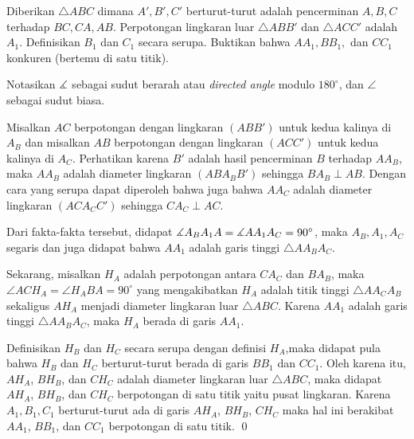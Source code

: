 \documentclass[11pt]{scrartcl}
\begin{document}
	\begin{soalbaru} 
		Diberikan $\triangle ABC$ dimana $A',B',C'$ berturut-turut adalah pencerminan $A,B,C$ terhadap $BC,CA,AB$. Perpotongan lingkaran luar $\triangle ABB'$ dan $\triangle ACC'$ adalah $A_1$. Definisikan $B_1$ dan $C_1$ secara serupa. Buktikan bahwa $AA_1,BB_1,$ dan $CC_1$ konkuren (bertemu di satu titik).\\[-10pt]
		
    \begin{solusi}
		Notasikan $\measuredangle$ sebagai sudut berarah atau \textit{ directed angle} modulo $180^\circ$, dan $\angle$ sebagai sudut biasa.
		
		Misalkan $AC$ berpotongan dengan lingkaran $(ABB')$ untuk kedua kalinya di $A_B$ dan misalkan $AB$ berpotongan dengan lingkaran $(ACC')$ untuk kedua kalinya di $A_C$. Perhatikan karena $B'$ adalah hasil pencerminan $B$ terhadap $AA_B$, maka $AA_B$ adalah diameter lingkaran $(ABA_BB')$ sehingga  $BA_B \perp AB$. Dengan cara yang serupa dapat diperoleh bahwa juga bahwa $AA_C$ adalah diameter lingkaran $(ACA_CC')$ sehingga $CA_C \perp AC$.
		
		Dari fakta-fakta tersebut, didapat $\measuredangle A_BA_1A = \measuredangle AA_1A_C = 90^\circ$, maka $A_B, A_1, A_C$ segaris dan juga didapat bahwa $AA_1$ adalah garis tinggi $\triangle AA_BA_C$.
		
		Sekarang, misalkan $H_A$ adalah perpotongan antara $CA_C$ dan $BA_B$, maka $\angle ACH_A = \angle H_ABA = 90^\circ$ yang mengakibatkan $H_A$ adalah titik tinggi $\triangle AA_CA_B$ sekaligus $AH_A$ menjadi diameter lingkaran luar $\triangle ABC$. Karena $AA_1$ adalah garis tinggi $\triangle AA_BA_C$, maka $H_A$ berada di garis $AA_1$.
		
		Definisikan $H_B$ dan $H_C$ secara serupa dengan definisi $H_A$,maka didapat pula bahwa $H_B$ dan $H_C$ berturut-turut berada di garis $BB_1$ dan $CC_1$. Oleh karena itu, $AH_A$, $BH_B$, dan $CH_C$ adalah diameter lingkaran luar $\triangle ABC$, maka didapat $AH_A$, $BH_B$, dan $CH_C$ berpotongan di satu titik yaitu pusat lingkaran. Karena $A_1,B_1,C_1$ berturut-turut ada di garis $AH_A$, $BH_B$, $CH_C$ maka hal ini berakibat $AA_1$, $BB_1$, dan $CC_1$ berpotongan di satu titik. \qed
                \begin{center}
\end{center}
\end{solusi}
\end{soalbaru}
\end{document}
